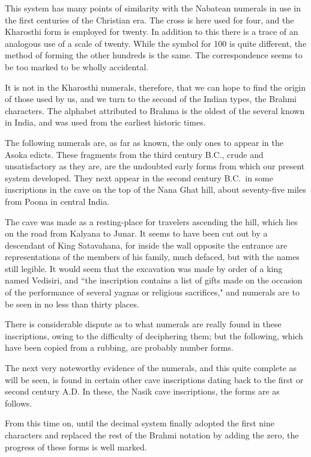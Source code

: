 \documentclass[11pt,a4paper]{article}
\begin{document}
This system has many points of similarity with the Nabatean numerals in use in the first centuries of the Christian era. The cross is here used for four, and the Kharosthi form is employed for twenty. In addition to this there is a trace of an analogous use of a scale of twenty. While the symbol for 100 is quite different, the method of forming the other hundreds is the same. The correspondence seems to be too marked to be wholly accidental.

It is not in the Kharosthi numerals, therefore, that we can hope to find the origin of those used by us, and we turn to the second of the Indian types, the Brahmi characters. The alphabet attributed to Brahma is the oldest of the several known in India, and was used from the earliest historic times.

The following numerals are, as far as known, the only ones to appear in the Asoka edicts. These fragments from the third century B.C., crude and unsatisfactory as they are, are the undoubted early forms from which our present system developed. They next appear in the second century B.C.\ in some inscriptions in the cave on the top of the Nana Ghat hill, about seventy-five miles from Poona in central India.

The cave was made as a resting-place for travelers ascending the hill, which lies on the road from Kalyana to Junar. It seems to have been cut out by a descendant of King Satavahana, for inside the wall opposite the entrance are representations of the members of his family, much defaced, but with the names still legible. It would seem that the excavation was made by order of a king named Vedisiri, and ``the inscription contains a list of gifts made on the occasion of the performance of several yagnas or religious sacrifices," and numerals are to be seen in no less than thirty places.

There is considerable dispute as to what numerals are really found in these inscriptions, owing to the difficulty of deciphering them; but the following, which have been copied from a rubbing, are probably number forms.

The next very noteworthy evidence of the numerals, and this quite complete as will be seen, is found in certain other cave inscriptions dating back to the first or second century A.D. In these, the Nasik cave inscriptions, the forms are as follows.

From this time on, until the decimal system finally adopted the first nine characters and replaced the rest of the Brahmi notation by adding the zero, the progress of these forms is well marked.
\end{document}
